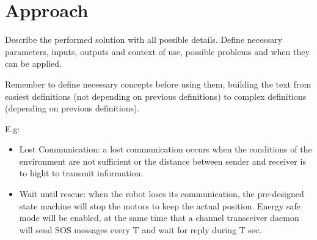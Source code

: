 \chapter{Approach}

Describe the performed solution with all possible details. Define necessary parameters, inputs, outputs and context of use, possible problems and when they can be applied. 

Remember to define necessary concepts before using them, building the text from easiest definitions (not depending on previous definitions) to complex definitions (depending on previous definitions).

E.g: 
\begin{itemize}
	\item Lost Communication: a lost communication occurs when the conditions of the environment are not sufficient or the distance between sender and receiver is to hight to transmit information.
	\item Wait until rescue: when the robot loses its communication, the pre-designed state machine will stop the motors to keep the actual position. Energy safe mode will be enabled, at the same time that a channel transceiver daemon will send SOS messages every T and wait for reply during T sec. 
\end{itemize}
